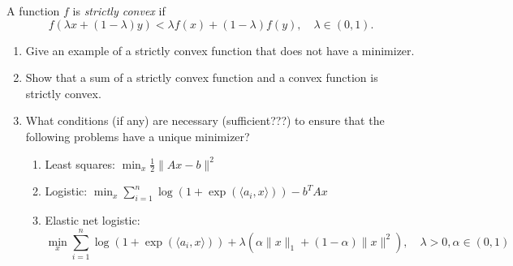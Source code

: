 \documentclass[10pt]{article}
\begin{document}
\begin{solution}[Solution]
\begin{enumerate}[label=(\alph*)]
\end{enumerate}

\end{solution}



\begin{problem}[Problem 3]
A function \( f \) is {\it strictly convex} if 
\[
f(\lambda x + (1-\lambda)y) < \lambda f(x) + (1-\lambda) f(y), \quad \lambda \in (0,1).
\]
\begin{enumerate}[label=(\alph*)]
\item Give an example of a strictly convex function that 
does not have a minimizer. 
\item Show that a sum of a strictly convex function and a convex function is strictly convex. 
\item What conditions (if any) are necessary (sufficient???) to ensure that the following problems have a unique minimizer?  
\begin{enumerate}[label=(\roman*)]
\item Least squares: \( \min_x \frac{1}{2}\|Ax - b\|^2 \)
\item Logistic: \( \min_x \sum_{i=1}^n \log(1 + \exp(\langle a_i, x\rangle))- b^TAx \)
\item Elastic net logistic: 
\[
\min_x \sum_{i=1}^n \log(1 + \exp(\langle a_i, x\rangle)) + \lambda(\alpha \|x\|_1 + (1-\alpha)\|x\|^2), \quad \lambda>0, \alpha \in (0,1)
\]
\end{enumerate}
\end{enumerate}
\end{problem}
\end{document}

